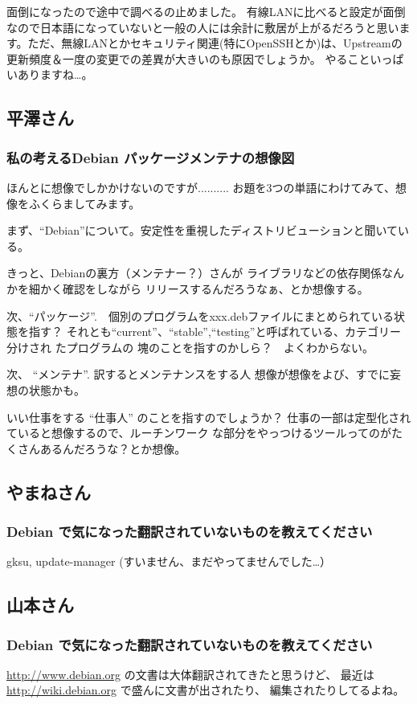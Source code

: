 \documentclass[mingoth,a4paper]{jsarticle}
\begin{document}
面倒になったので途中で調べるの止めました。
有線LANに比べると設定が面倒なので日本語になっていないと一般の人には余計に敷居が上がるだろうと思います。ただ、無線LANとかセキュリティ関連(特にOpenSSHとか)は、Upstreamの更新頻度＆一度の変更での差異が大きいのも原因でしょうか。
やることいっぱいありますね…。


\subsection{平澤さん}
\subsubsection{私の考えるDebian パッケージメンテナの想像図}

ほんとに想像でしかかけないのですが..........
お題を3つの単語にわけてみて、想像をふくらましてみます。

まず、``Debian''について。安定性を重視したディストリビューションと聞いている。

きっと、Debianの裏方（メンテナー？）さんが
ライブラリなどの依存関係なんかを細かく確認をしながら
リリースするんだろうなぁ、とか想像する。

次、``パッケージ''.　個別のプログラムをxxx.debファイルにまとめられている状
態を指す？
それとも``current''、``stable'',``testing''と呼ばれている、カテゴリー分けされ
たプログラムの
塊のことを指すのかしら？　よくわからない。

次、 ``メンテナ''. 訳するとメンテナンスをする人
想像が想像をよび、すでに妄想の状態かも。

いい仕事をする ``仕事人'' のことを指すのでしょうか？
仕事の一部は定型化されていると想像するので、ルーチンワーク
な部分をやっつけるツールってのがたくさんあるんだろうな？とか想像。

\subsection{やまねさん}
\subsubsection{Debian で気になった翻訳されていないものを教えてください}
gksu, update-manager (すいません、まだやってませんでした…）

\subsection{山本さん}
\subsubsection{Debian で気になった翻訳されていないものを教えてください}
\url{http://www.debian.org} の文書は大体翻訳されてきたと思うけど、
最近は \url{http://wiki.debian.org} で盛んに文書が出されたり、
編集されたりしてるよね。
\end{document}
